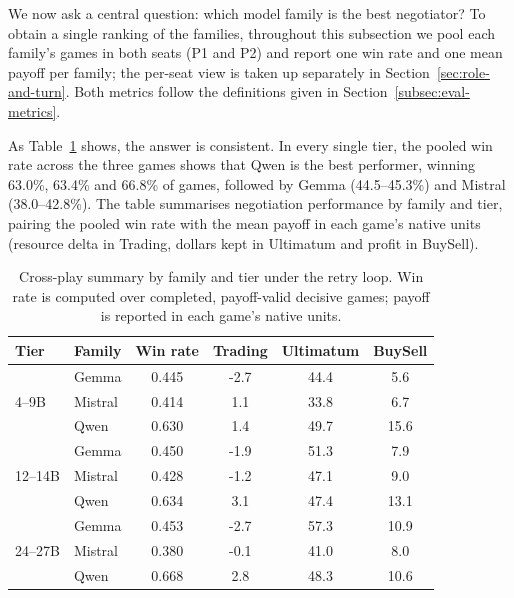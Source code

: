 
We now ask a central question: which model family is the best negotiator? To obtain a single ranking of the families, throughout this subsection we pool each family's games in both seats (P1 and P2) and report one win rate and one mean payoff per family; the per-seat view is taken up separately in Section~\ref{sec:role-and-turn}. Both metrics follow the definitions given in Section~\ref{subsec:eval-metrics}.


As Table~\ref{tab:cross-play-family-summary} shows, the answer is consistent. In every single tier, the pooled win rate across the three games shows that Qwen is the best performer, winning 63.0\%, 63.4\% and 66.8\% of games, followed by Gemma (44.5--45.3\%) and Mistral (38.0--42.8\%). The table summarises negotiation performance by family and tier, pairing the pooled win rate with the mean payoff in each game's native units (resource delta in Trading, dollars kept in Ultimatum and profit in BuySell).

\begin{table}
\centering
\small
\caption{Cross-play summary by family and tier under the retry loop. Win rate is computed over completed, payoff-valid decisive games; payoff is reported in each game's native units.}
\label{tab:cross-play-family-summary}
\begin{tabular}{llcccc}
\toprule
\textbf{Tier} & \textbf{Family} & \textbf{Win rate} & \textbf{Trading} & \textbf{Ultimatum} & \textbf{BuySell} \\
\midrule
\multirow{3}{*}{4--9B}
  & Gemma   & 0.445 & -2.7 & 44.4 &  5.6 \\
  & Mistral & 0.414 &  1.1 & 33.8 &  6.7 \\
  & Qwen    & 0.630 &  1.4 & 49.7 & 15.6 \\
\midrule
\multirow{3}{*}{12--14B}
  & Gemma   & 0.450 & -1.9 & 51.3 &  7.9 \\
  & Mistral & 0.428 & -1.2 & 47.1 &  9.0 \\
  & Qwen    & 0.634 &  3.1 & 47.4 & 13.1 \\
\midrule
\multirow{3}{*}{24--27B}
  & Gemma   & 0.453 & -2.7 & 57.3 & 10.9 \\
  & Mistral & 0.380 & -0.1 & 41.0 &  8.0 \\
  & Qwen    & 0.668 &  2.8 & 48.3 & 10.6 \\
\bottomrule
\end{tabular}
\end{table}

